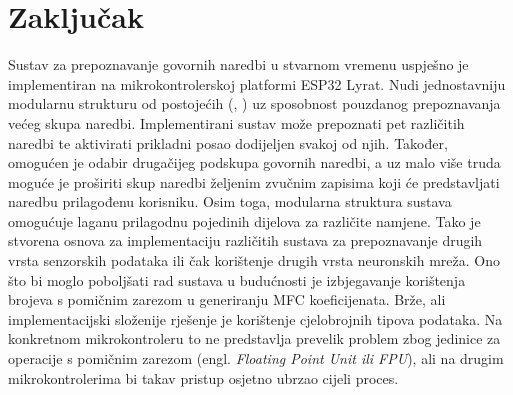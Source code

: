 \chapter{Zaključak}
\label{pog:zakljucak}

Sustav za prepoznavanje govornih naredbi u stvarnom vremenu uspješno je implementiran
na mikrokontrolerskoj platformi ESP32 Lyrat. Nudi jednostavniju modularnu
strukturu od postojećih (\cite{arm_kws}, \cite{tflmicrospeech}) uz sposobnost pouzdanog 
prepoznavanja većeg skupa
naredbi. Implementirani sustav može prepoznati pet
različitih naredbi te aktivirati prikladni posao dodijeljen svakoj od njih. 
Također, omogućen je odabir 
drugačijeg podskupa govornih naredbi, a uz malo više truda moguće je proširiti skup naredbi
željenim zvučnim zapisima koji će predstavljati naredbu prilagođenu korisniku.
Osim toga, modularna struktura sustava
omogućuje laganu prilagodnu pojedinih dijelova za različite namjene. Tako je stvorena
osnova za implementaciju različitih sustava za prepoznavanje drugih vrsta senzorskih podataka
ili čak korištenje drugih vrsta neuronskih mreža. Ono što bi moglo poboljšati rad sustava
u budućnosti je
izbjegavanje korištenja brojeva s pomičnim zarezom u generiranju MFC koeficijenata. Brže, ali 
implementacijski složenije rješenje je korištenje cjelobrojnih tipova podataka. Na konkretnom
mikrokontroleru to ne predstavlja prevelik problem zbog jedinice
za operacije s pomičnim zarezom (engl. \textit{Floating Point Unit ili FPU}),
ali na drugim mikrokontrolerima bi takav pristup osjetno ubrzao cijeli proces.


